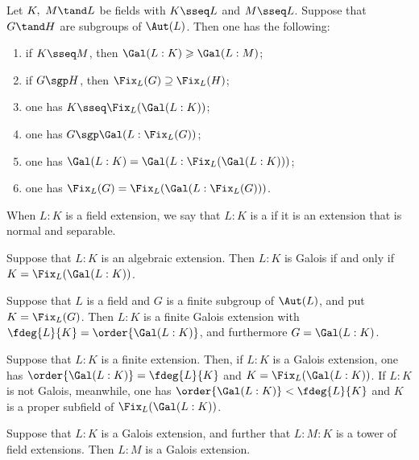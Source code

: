 \documentclass{article}
\begin{document}
  \begin{tproposition}
    Let $ K,\ M \tand L $ be fields with $ K\sseq L $ and $ M\sseq L $.
    Suppose that $ G\tand H $ are subgroups of $ \Aut(L) $.
    Then one has the following: \begin{enumerate}[label=(\alph*)]
      \item if $ K\sseq M $, then $ \Gal(L:K) \geqslant \Gal(L:M) $;
      \item if $ G\sgp H $, then $ \Fix_L(G)\supseteq \Fix_L(H) $;
      \item one has $ K\sseq \Fix_L(\Gal(L:K)) $;
      \item one has $ G\sgp\Gal(L:\Fix_L(G)) $;
      \item one has $ \Gal(L:K) = \Gal(L:\Fix_L(\Gal(L:K))) $;
      \item one has $ \Fix_L(G) = \Fix_L(\Gal(L:\Fix_L(G))) $.
    \end{enumerate}
  \end{tproposition}

  \begin{tdefinition}
    When $ L:K $ is a field extension, we say that $ L:K $ is a  if it is an extension that is normal and separable.
  \end{tdefinition}

  \begin{ttheorem}
    Suppose that $ L:K $ is an algebraic extension.
    Then $ L:K $ is Galois if and only if $ K=\Fix_L(\Gal(L:K)) $.
  \end{ttheorem}

  \begin{ttheorem}
    Suppose that $ L $ is a field and $ G $ is a finite subgroup of $ \Aut(L) $, and put $ K=\Fix_L(G) $.
    Then $ L:K $ is a finite Galois extension with $ \fdeg{L}{K}=\order{\Gal(L:K)} $, and furthermore $ G=\Gal(L:K) $.
  \end{ttheorem}

  \begin{ttheorem}
    Suppose that $ L:K $ is a finite extension.
    Then, if $ L:K $ is a Galois extension, one has $ \order{\Gal(L:K)}=\fdeg{L}{K} $ and $ K=\Fix_L(\Gal(L:K)) $.
    If $ L:K $ is not Galois, meanwhile, one has $ \order{\Gal(L:K)}<\fdeg{L}{K} $ and $ K $ is a proper subfield of $ \Fix_L(\Gal(L:K)) $.
  \end{ttheorem}

  \begin{tproposition}
    Suppose that $ L:K $ is a Galois extension, and further that $ L:M:K $ is a tower of field extensions.
    Then $ L:M $ is a Galois extension.
  \end{tproposition}
\end{document}
